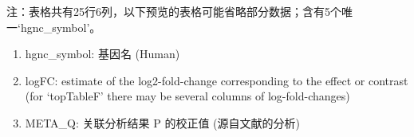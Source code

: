 \documentclass[
]{article}
\providecommand{\tightlist}{%
  \setlength{\itemsep}{0pt}\setlength{\parskip}{0pt}}
\begin{document}
\begin{center}\begin{tcolorbox}[colback=gray!10, colframe=gray!50, width=0.9\linewidth, arc=1mm, boxrule=0.5pt]注：表格共有25行6列，以下预览的表格可能省略部分数据；含有5个唯一`hgnc\_symbol'。
\end{tcolorbox}
\end{center}
\begin{center}\begin{tcolorbox}[colback=gray!10, colframe=gray!50, width=0.9\linewidth, arc=1mm, boxrule=0.5pt]\begin{enumerate}\tightlist
\item hgnc\_symbol:  基因名 (Human)
\item logFC:  estimate of the log2-fold-change corresponding to the effect or contrast (for ‘topTableF’ there may be several columns of log-fold-changes)
\item META\_Q:  关联分析结果 P 的校正值 (源自文献的分析)
\end{enumerate}\end{tcolorbox}
\end{center}
\end{document}

